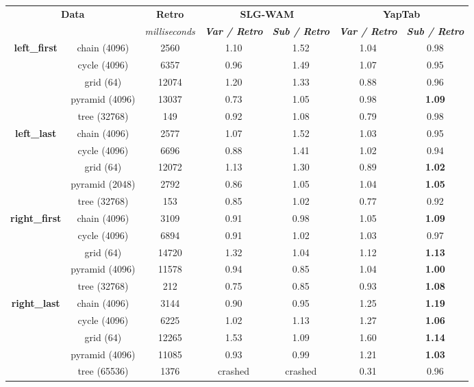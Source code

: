 \begin{table}[ht]
\centering
\footnotesize{
  \begin{tabular}{cc|c|cc|cc}
   \hline
    \hline
    \multicolumn{2}{c|}{\multirow{2}{*}{\small{\textbf{Data}}}} & \textbf{\small{Retro}} & \multicolumn{2}{c|}{\small{\textbf{SLG-WAM}}} & \multicolumn{2}{c}{\small{\textbf{YapTab}}} \\
     \multicolumn{2}{c|}{} & \scriptsize{\textit{milliseconds}} & \textbf{\textit{\scriptsize{Var / Retro}}} & \textbf{\textit{\scriptsize{Sub / Retro}}} & \textbf{\textit{\scriptsize{Var / Retro}}} & \textbf{\textit{\scriptsize{Sub / Retro}}} \\
   \hline
   \hline
   \multirow{5}{*}{\textbf{left\_first}} &  chain  (4096)  &  2560 &  1.10  &  1.52  &  1.04 &  0.98 \\
   &  cycle  (4096)  &  6357 &  0.96  &  1.49  &  1.07 &  0.95 \\
   &  grid  (64)  &  12074 &  1.20  &  1.33  &  0.88 &  0.96 \\
   &  pyramid  (4096)  &  13037 &  0.73  &  1.05  &  0.98 &  \textbf{1.09} \\
   &  tree  (32768)  &  149 &  0.92  &  1.08  &  0.79 &  0.98 \\
   \hline
   \multirow{5}{*}{\textbf{left\_last}} &  chain  (4096)  &  2577 &  1.07  &  1.52  &  1.03 &  0.95 \\
   &  cycle  (4096)  &  6696 &  0.88  &  1.41  &  1.02 &  0.94 \\
   &  grid  (64)  &  12072 &  1.13  &  1.30  &  0.89 &  \textbf{1.02} \\
   &  pyramid  (2048)  &  2792 &  0.86  &  1.05  &  1.04 &  \textbf{1.05} \\
   &  tree  (32768)  &  153 &  0.85  &  1.02  &  0.77 &  0.92 \\
   \hline
   \multirow{5}{*}{\textbf{right\_first}} &  chain  (4096)  &  3109 &  0.91  &  0.98  &  1.05 &  \textbf{1.09} \\
   &  cycle  (4096)  &  6894 &  0.91  &  1.02  &  1.03 &  0.97 \\
   &  grid  (64)  &  14720 &  1.32  &  1.04  &  1.12 &  \textbf{1.13} \\
   &  pyramid  (4096)  &  11578 &  0.94  &  0.85  &  1.04 &  \textbf{1.00} \\
   &  tree  (32768)  &  212 &  0.75  &  0.85  &  0.93 &  \textbf{1.08} \\
   \hline
   \multirow{5}{*}{\textbf{right\_last}} &  chain  (4096)  &  3144 &  0.90  &  0.95  &  1.25 &  \textbf{1.19} \\
   &  cycle  (4096)  &  6225 &  1.02  &  1.13  &  1.27 &  \textbf{1.06} \\
   &  grid  (64)  &  12265 &  1.53  &  1.09  &  1.60 &  \textbf{1.14} \\
   &  pyramid  (4096)  &  11085 &  0.93  &  0.99  &  1.21 &  \textbf{1.03} \\
   &  tree  (65536)  &  1376 &  \scriptsize{crashed}  &  \scriptsize{crashed}  &  0.31 &  0.96 \\
   \hline
   

\end{tabular}}
\end{table}
